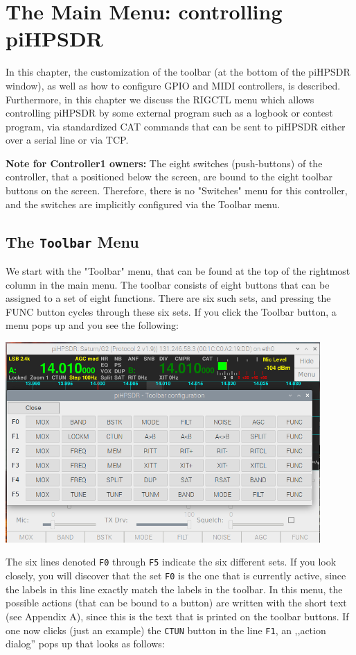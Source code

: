 \documentclass[12pt]{book}
\begin{document}
\chapter{The Main Menu: controlling piHPSDR}

In this chapter, the customization of the toolbar (at the bottom of the piHPSDR window),
as well as how to configure GPIO and MIDI controllers, is described. Furthermore, in this
chapter we discuss the RIGCTL menu which allows controlling piHPSDR by some external program
such as a logbook or contest program, via standardized CAT commands that can be sent to
piHPSDR either over a serial line or via TCP.

\textbf{Note for Controller1 owners:} The eight switches (push-buttons) of the controller,
that a positioned below the screen, are bound to the eight toolbar buttons on the screen.
Therefore, there is no "Switches" menu for this controller, and the switches are implicitly
configured via the Toolbar menu.

\section{The \texttt{Toolbar} Menu}
We start with the "Toolbar" menu, that can be found at the top of the rightmost
column in the main menu. The toolbar consists of eight buttons that can be assigned
to a set of eight functions. There are six such sets, and pressing the FUNC button
cycles through these six sets. If you click the Toolbar button, a menu pops up and
you see the following:

\begin{center}
\includegraphics[width=12cm]{ToolbarMenu1.png}
\end{center}

The six lines denoted \texttt{F0} through \texttt{F5} indicate the six different sets. If you
look closely, you will discover that the set \texttt{F0} is the one that is currently active,
since the labels in this line exactly match the labels in the toolbar. In this menu, the
possible actions (that can be bound to a button) are written with the short text (see Appendix A),
since this is the text that is printed on the toolbar buttons. If one now clicks (just an example)
the \texttt{CTUN} button in the line \texttt{F1}, an ,,action dialog'' pops up that looks as follows:
\end{document}
